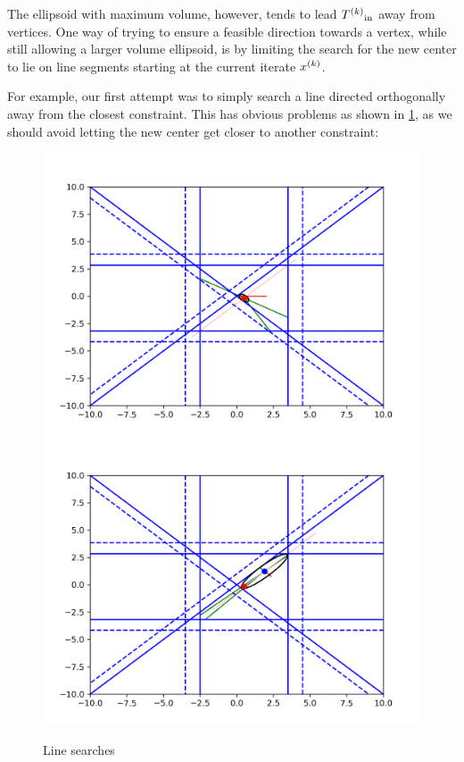 The ellipsoid with maximum volume, however, tends to lead ${T^{(k)}}_{\text{in}}$ away from vertices.
One way of trying to ensure a feasible direction towards a vertex, while still allowing a larger volume ellipsoid, is by limiting the search for the new center to lie on line segments starting at the current iterate ${x}^{(k)}$.

For example, our first attempt was to simply search a line directed orthogonally away from the closest constraint.
This has obvious problems as shown in \cref{first_line_search}, as we should avoid letting the new center get closer to another constraint:

\begin{figure}[h]
    \centering
    \includegraphics[scale=0.4]{images/line_1.png}
    \includegraphics[scale=0.4]{images/line_2.png}
    \caption{Line searches}
    \label{first_line_search}
\end{figure}


